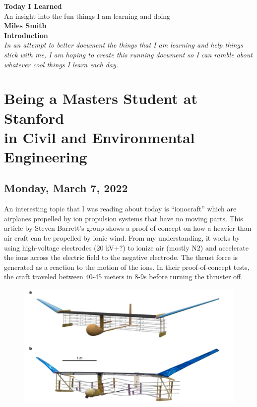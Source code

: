 \documentclass[12pt]{report}
\begin{document}
\begin{center}
\huge{\textbf{Today I Learned}}\\
\large{An insight into the fun things I am learning and doing}\\

\vspace*{0.5cm}
\textbf{Miles Smith}\\

\vspace*{1cm}
\textbf{Introduction}\\
\textit{In an attempt to better document the things that I am learning and help things stick with me, I am hoping to create this running document so I can ramble about whatever cool things I learn each day.}\\
\vspace*{2cm}
\clearpage

\tableofcontents

\clearpage

\end{center}

\chapter{Being a Masters Student at Stanford \\ in Civil and Environmental Engineering}

\clearpage

\section{Monday, March 7, 2022}
\par
An interesting topic that I was reading about today is “ionocraft” which are airplanes propelled by ion propulsion systems that have no moving parts. This article by Steven Barrett’s group shows a proof of concept on how a heavier than air craft can be propelled by ionic wind. From my understanding, it works by using high-voltage electrodes (20 kV+?) to ionize air (mostly N2) and accelerate the ions across the electric field to the negative electrode.  The thrust force is generated as a reaction to the motion of the ions. In their proof-of-concept tests, the craft traveled between 40-45 meters in 8-9s before turning the thruster off.

\begin{figure}[H]
\centering
\includegraphics[width=\linewidth]{images/ionicwindplane.pdf}
\end{figure}
\end{document}
